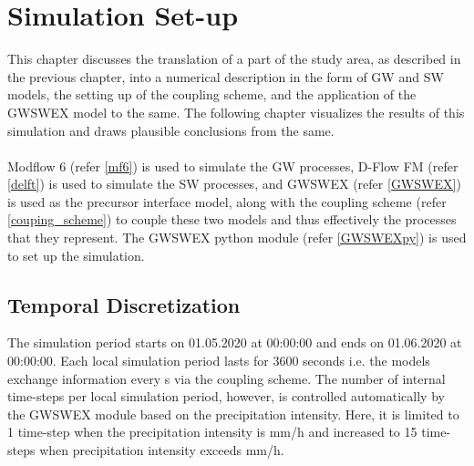 \chapter{Simulation Set-up}
\label{wasenmoos_model}
This chapter discusses the translation of a part of the study area, as described in the previous chapter, into a numerical description in the form of GW and SW models, the setting up of the coupling scheme, and the application of the GWSWEX model to the same. The following chapter visualizes the results of this simulation and draws plausible conclusions from the same.
\\ \\
Modflow 6 (refer \ref{mf6}) is used to simulate the GW processes, D-Flow FM (refer \ref{delft}) is used to simulate the SW processes, and GWSWEX (refer \ref{GWSWEX}) is used as the precursor interface model, along with the coupling scheme (refer \ref{couping_scheme}) to couple these two models and thus effectively the processes that they represent. The GWSWEX python module (refer \ref{GWSWEXpy}) is used to set up the simulation.   

\section{Temporal Discretization}
The simulation period starts on 01.05.2020 at 00:00:00 and ends on 01.06.2020 at 00:00:00. Each local simulation period lasts for 3600 seconds i.e. the models exchange information every \unit[3600]{s} via the coupling scheme.
The number of internal time-steps per local simulation period, however, is controlled automatically by the GWSWEX module based on the precipitation intensity. Here, it is limited to 1 time-step when the precipitation intensity is \unit[0]{mm/h} and increased to 15 time-steps when precipitation intensity exceeds \unit[1]{mm/h}.

